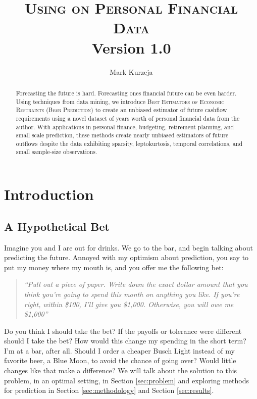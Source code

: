 \documentclass[11pt,a4paper]{article}
\title{\textsc{Using \beer on Personal Financial Data}  \\ {\small Version 1.0}}
\author{Mark Kurzeja}
\date{}
\newcommand{\beer}{\textsc{Beer Prediction}\xspace}
\begin{document}
\maketitle
\begin{abstract}



Forecasting the future is hard. Forecasting ones financial future can be even harder. Using techniques from data mining, we introduce \textsc{Best Estimators of Economic Restraints} (\beer) to create an unbiased estimator of future cashflow requirements using a novel dataset of years worth of personal financial data from the author. With applications in personal finance, budgeting, retirement planning, and small scale prediction, these methods create nearly unbiased estimators of future outflows despite the data exhibiting sparsity, leptokurtosis, temporal correlations, and small sample-size observations. 

  
\end{abstract}

\section{Introduction} \label{sec:introduction}

\subsection{A Hypothetical Bet}

Imagine you and I are out for drinks. We go to the bar, and begin talking about predicting the future.  Annoyed with my optimism about prediction, you say to put my money where my mouth is, and you offer me the following bet:

\begin{quote}
	\it \color{harvardcrimson}
	``Pull out a piece of paper. Write down the exact dollar amount that you think you’re going to spend this month on anything you like. If you're right, within \$100, I'll give you \$1,000. Otherwise, you will owe me \$1,000'' 
\end{quote} 

Do you think I should take the bet? If the payoffs or tolerance were different should I take the bet? How would this change my spending in the short term? I’m at a bar, after all. Should I order a cheaper Busch Light instead of my favorite beer, a Blue Moon, to avoid the chance of going over? Would little changes like that make a difference? We will talk about the solution to this problem, in an optimal setting, in Section \ref{sec:problem} and exploring methods for prediction in Section \ref{sec:methodology} and Section \ref{sec:results}.
\end{document}
